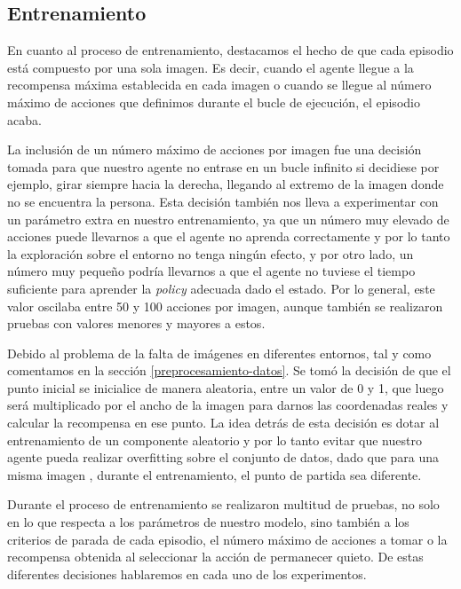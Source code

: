 \subsection{Entrenamiento}
\label{entrenamiento}

En cuanto al proceso de entrenamiento, destacamos el hecho de que cada episodio está compuesto por una sola imagen. Es decir, cuando el agente llegue a la recompensa máxima establecida en cada imagen o cuando se llegue al número máximo de acciones que definimos durante el bucle de ejecución, el episodio acaba. 
\medskip

La inclusión de un número máximo de acciones por imagen fue una decisión tomada para que nuestro agente no entrase en un bucle infinito si decidiese por ejemplo, girar siempre hacia la derecha, llegando al extremo de la imagen donde no se encuentra la persona. Esta decisión también nos lleva a experimentar con un parámetro extra en nuestro entrenamiento, ya que un número muy elevado de acciones puede llevarnos a que el agente no aprenda correctamente y por lo tanto la exploración sobre el entorno no tenga ningún efecto, y por otro lado, un número muy pequeño podría llevarnos a que el agente no tuviese el tiempo suficiente para aprender la \textit{policy} adecuada dado el estado. Por lo general, este valor oscilaba entre 50 y 100 acciones por imagen, aunque también se realizaron pruebas con valores menores y mayores a estos.
\medskip

Debido al problema de la falta de imágenes en diferentes entornos, tal y como comentamos en la sección \ref{preprocesamiento-datos}. Se tomó la decisión de que el punto inicial se inicialice de manera aleatoria, entre un valor de 0 y 1, que luego será multiplicado por el ancho de la imagen para darnos las coordenadas reales y calcular la recompensa en ese punto. La idea detrás de esta decisión es dotar al entrenamiento de un componente aleatorio y por lo tanto evitar que nuestro agente pueda realizar overfitting sobre el conjunto de datos, dado que para una misma imagen , durante el entrenamiento, el punto de partida sea diferente.
\medskip

Durante el proceso de entrenamiento se realizaron multitud de pruebas, no solo en lo que respecta a los parámetros de nuestro modelo, sino también a los criterios de parada de cada episodio, el número máximo de acciones a tomar o la recompensa obtenida al seleccionar la acción de permanecer quieto. De estas diferentes decisiones hablaremos en cada uno de los experimentos.
\medskip


